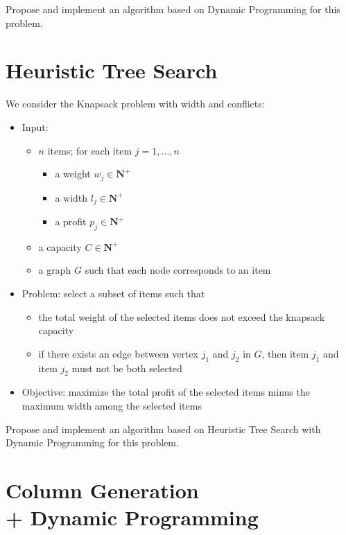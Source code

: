 \documentclass[a4paper,twocolumn]{article}
\newcommand{\N}{\mathbf{N}}
\begin{document}
Propose and implement an algorithm based on Dynamic Programming for this problem.

\section{Heuristic Tree Search}

We consider the Knapsack problem with width and conflicts:
\begin{itemize}
  \item Input:
    \begin{itemize}
      \item $n$ items; for each item $j = 1, \dots, n$
        \begin{itemize}
          \item a weight $w_j \in \N^+$
          \item a width $l_j \in \N^+$
          \item a profit $p_j \in \N^+$
        \end{itemize}
      \item a capacity $C \in \N^+$
      \item a graph $G$ such that each node corresponds to an item
    \end{itemize}
  \item Problem: select a subset of items such that
    \begin{itemize}
      \item the total weight of the selected items does not exceed the knapsack capacity
      \item if there exists an edge between vertex $j_1$ and $j_2$ in $G$, then item $j_1$ and item $j_2$ must not be both selected
    \end{itemize}
  \item Objective: maximize the total profit of the selected items minus the maximum width among the selected items
\end{itemize}

Propose and implement an algorithm based on Heuristic Tree Search with Dynamic Programming for this problem.

\section{Column Generation \\ + Dynamic Programming}
\end{document}
